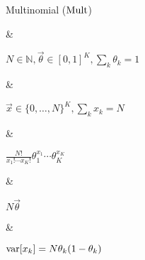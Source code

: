 Multinomial ($\operatorname{Mult}$)

&

$N \in \mathbb N, \vec \theta \in [0, 1]^K, \sum_k \theta_k = 1$

& 

$\vec x \in \{0, \dotsc, N\}^K, \sum_k x_k = N$

&

\(\displaystyle
	\frac{N!}{x_1! \cdots x_K!} \theta_1^{x_1} \cdots \theta_K^{x_K}
\)

& 

$N\vec \theta$

&

$\operatorname{\mathrm{var}}[x_k] = N\theta_k(1 - \theta_k)$